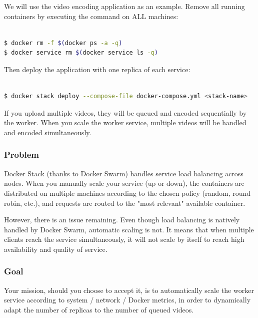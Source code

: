 \documentclass[a4paper,11pt]{exam}
\begin{document}
We will use the video encoding application as an example.
Remove all running containers by executing the command on ALL machines:

\begin{lstlisting}[frame=single,language={sh}]  % Start your code-block

$ docker rm -f $(docker ps -a -q)
$ docker service rm $(docker service ls -q)

\end{lstlisting}

Then deploy the application with one replica of each service:

\begin{lstlisting}[frame=single,language={sh}]  % Start your code-block

$ docker stack deploy --compose-file docker-compose.yml <stack-name>

\end{lstlisting}

If you upload multiple videos, they will be queued and encoded sequentially by the worker.
When you scale the worker service, multiple videos will be handled and encoded simultaneously.

\subsubsection{Problem}

Docker Stack (thanks to Docker Swarm) handles service load balancing across nodes.
When you manually scale your service (up or down), the containers are distributed on multiple machines according to the chosen policy (random, round robin, etc.), and requests are routed to the "most relevant" available container.

However, there is an issue remaining.
Even though load balancing is natively handled by Docker Swarm, automatic scaling is not.
It means that when multiple clients reach the service simultaneously, it will not scale by itself to reach high availability and quality of service.

\subsubsection{Goal}

Your mission, should you choose to accept it, is to automatically scale the worker service according to system / network / Docker metrics, in order to dynamically adapt the number of replicas to the number of queued videos.
\end{document}
